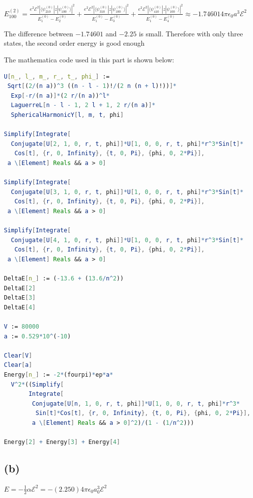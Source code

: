 \documentclass[12pt]{article}
\begin{document}
\begin{spacing}{2.0}
$E_{100}^{(2)}= \frac{e^2 \mathcal{E}^2 |\langle \psi_{210}^{(0)}|z| \psi_{100}^{(0)} \rangle|^2}{E_1^{(0)} -E_2^{(0)}} +
\frac{e^2 \mathcal{E}^2 |\langle \psi_{310}^{(0)}|z| \psi_{100}^{(0)} \rangle|^2}{E_1^{(0)} -E_3^{(0)}} +
\frac{e^2 \mathcal{E}^2 |\langle \psi_{410}^{(0)}|z| \psi_{100}^{(0)} \rangle|^2}{E_1^{(0)} -E_4^{(0)}}\approx -1.74601 4\pi \epsilon_0 a^3 \mathcal{E}^2 $

The difference between $-1.74601$ and $-2.25$ is small. Therefore with only three states, the second order energy is good enough

The mathematica code used in this part is shown below:

\begin{lstlisting}[language=Mathematica,breaklines=true,frame=single]
U[n_, l_, m_, r_, t_, phi_] :=
 Sqrt[(2/(n a))^3 ((n - l - 1)!/(2 n (n + l)!))]*
  Exp[-r/(n a)]*(2 r/(n a))^l*
  LaguerreL[n - l - 1, 2 l + 1, 2 r/(n a)]*
  SphericalHarmonicY[l, m, t, phi]

Simplify[Integrate[
  Conjugate[U[2, 1, 0, r, t, phi]]*U[1, 0, 0, r, t, phi]*r^3*Sin[t]*
   Cos[t], {r, 0, Infinity}, {t, 0, Pi}, {phi, 0, 2*Pi}],
 a \[Element] Reals && a > 0]

Simplify[Integrate[
  Conjugate[U[3, 1, 0, r, t, phi]]*U[1, 0, 0, r, t, phi]*r^3*Sin[t]*
   Cos[t], {r, 0, Infinity}, {t, 0, Pi}, {phi, 0, 2*Pi}],
 a \[Element] Reals && a > 0]

Simplify[Integrate[
  Conjugate[U[4, 1, 0, r, t, phi]]*U[1, 0, 0, r, t, phi]*r^3*Sin[t]*
   Cos[t], {r, 0, Infinity}, {t, 0, Pi}, {phi, 0, 2*Pi}],
 a \[Element] Reals && a > 0]

DeltaE[n_] := (-13.6 + (13.6/n^2))
DeltaE[2]
DeltaE[3]
DeltaE[4]

V := 80000
a := 0.529*10^(-10)

Clear[V]
Clear[a]
Energy[n_] := -2*(fourpi)*ep*a*
  V^2*((Simplify[
       Integrate[
        Conjugate[U[n, 1, 0, r, t, phi]]*U[1, 0, 0, r, t, phi]*r^3*
         Sin[t]*Cos[t], {r, 0, Infinity}, {t, 0, Pi}, {phi, 0, 2*Pi}],
        a \[Element] Reals && a > 0]^2)/(1 - (1/n^2)))

Energy[2] + Energy[3] + Energy[4]
\end{lstlisting}

\subsection*{(b)}

$E=-\frac{1}{2} \alpha \mathcal{E}^2 = -(2.250)4\pi\epsilon_0 a_0^3 \mathcal{E}^2$


\end{spacing}
\end{document}
